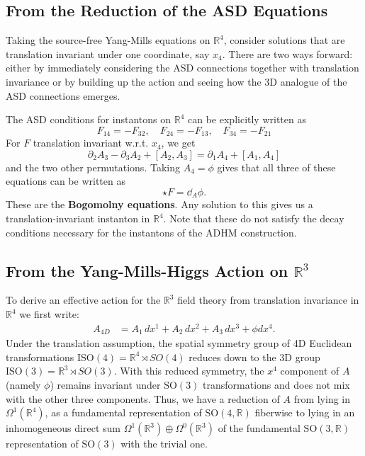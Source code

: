 	\subsection{From the Reduction of the ASD Equations}
	Taking the source-free Yang-Mills equations on $\mathbb R^4$, consider solutions that are translation invariant under one coordinate, say $x_4$. There are two ways forward: either by immediately considering the ASD connections together with translation invariance or by building up the action and seeing how the 3D analogue of the ASD connections emerges. 
	
	\begin{obs}
		The ASD conditions for instantons on $\mathbb R^4$ can be explicitly written as
		\begin{equation}
			F_{14}=-F_{32}, \quad F_{24}=-F_{13}, \quad F_{34}=-F_{21}
		\end{equation}
		For $F$ translation invariant w.r.t. $x_4$, we get
		\begin{equation}
			\partial_{2} A_3 - \partial_3 A_2 + [A_2, A_3] = \partial_1 A_4 + [A_1, A_4]
		\end{equation}
		and the two other permutations. Taking $A_4 = \phi$ gives that all three of these equations can be written as
		\begin{equation}
			\star F = \dd_A \phi.
		\end{equation}
		These are the \textbf{Bogomolny equations}. Any solution to this gives us a translation-invariant instanton in $\mathbb R^4$. Note that these do not satisfy the decay conditions necessary for the instantons of the ADHM construction.
	\end{obs}
	
	\subsection{From the Yang-Mills-Higgs Action on $\mathbb R^3$}
	To derive an effective action for the $\mathbb R^3$ field theory from translation invariance in $\mathbb R^4$ we first write:
	\begin{equation*}
		\begin{aligned}
			A_{4D} &= A_1\, dx^1 + A_2\, dx^2 + A_3\, dx^3 + \phi dx^4.
		\end{aligned}
	\end{equation*}
	Under the translation assumption, the spatial symmetry group of 4D Euclidean transformations $\mathrm{ISO}(4) = \mathbb R^4 \rtimes SO(4)$ reduces down to the 3D group $\mathrm{ISO}(3) = \mathbb R^3 \rtimes SO(3)$. With this reduced symmetry, the $x^4$ component of $A$ (namely $\phi$) remains invariant under $\mathrm{SO}(3)$ transformations and does not mix with the other three components. Thus, we have a reduction of $A$ from lying in $\Omega^1(\mathbb R^4)$, as a fundamental representation of $\mathrm{SO}(4, \mathbb R)$ fiberwise to lying in an inhomogeneous direct sum $\Omega^1(\mathbb R^3) \oplus \Omega^0(\mathbb R^3)$ of the fundamental $\mathrm{SO}(3, \mathbb R)$ representation of $\mathrm{SO}(3)$ with the trivial one.
	
